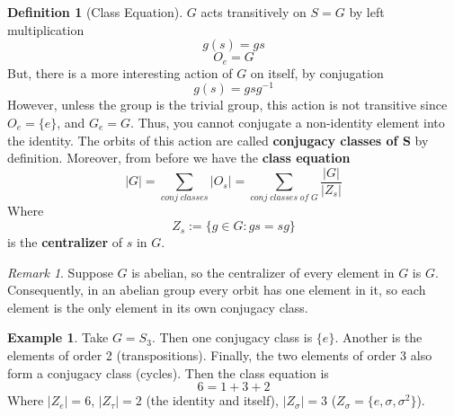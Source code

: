 \documentclass[12pt]{article}
\theoremstyle{definition}
\newtheorem{defn}[thm]{Definition}
\newtheorem{eg}[thm]{Example}
\theoremstyle{remark}
\newtheorem{rmk}[thm]{Remark}
\numberwithin{equation}{section}
\newcommand\B[1]{\textbf{ #1}}
\begin{document}
\vspace{15pt}

\begin{defn}[Class Equation]
        $G$ acts transitively on $S = G$ by left multiplication \begin{equation}
                g(s) = gs
        \end{equation}
        \begin{equation}
                O_e = G
        \end{equation}
        But, there is a more interesting action of $G$ on itself, by conjugation \begin{equation}
                g(s) = gsg^{-1}
        \end{equation}
        However, unless the group is the trivial group, this action is not transitive since $O_e = \{e\}$, and $G_e = G$. Thus, you cannot conjugate a non-identity element into the identity. The orbits of this action are called \B{conjugacy classes of S} by definition. Moreover, from before we have the \B{class equation} \begin{equation}
                |G| = \sum\limits_{conj\;classes}|O_s| = \sum\limits_{conj\;classes\;of\;G} \frac{|G|}{|Z_s|}
        \end{equation}
        Where \begin{equation}
                Z_s := \{g \in G: gs =sg \}
        \end{equation} 
        is the \B{centralizer} of $s$ in $G$.
\end{defn}


\vspace{15pt}

\begin{rmk}
        Suppose $G$ is abelian, so the centralizer of every element in $G$ is $G$. Consequently, in an abelian group every orbit has one element in it, so each element is the only element in its own conjugacy class.
\end{rmk}


\vspace{15pt}

\begin{eg}
        Take $G = S_3$. Then one conjugacy class is $\{e\}$. Another is the elements of order 2 (transpositions). Finally, the two elements of order 3 also form a conjugacy class (cycles). Then the class equation is \begin{equation}
                6 = 1 + 3 + 2
        \end{equation}
        Where $|Z_e| = 6$, $|Z_{\tau}| = 2$ (the identity and itself), $|Z_{\sigma}| = 3$ ($Z_{\sigma} = \{e,\sigma, \sigma^2\}$).
\end{eg}
\end{document}
